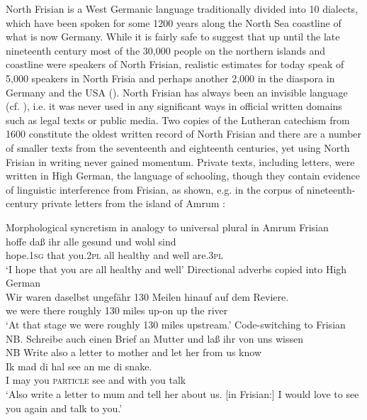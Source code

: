 \documentclass[output=paper]{langsci/langscibook}
\begin{document}
North Frisian is a West Germanic language traditionally divided into 10 dialects, which have been spoken for some 1200 years along the North Sea coastline of what is now Germany. While it is fairly safe to suggest that up until the late nineteenth century most of the 30,000 people on the northern islands and coastline were speakers of North Frisian, realistic estimates for today speak of 5,000 speakers in North Frisia and perhaps another 2,000 in the diaspora in Germany and the USA (\citealt{Arhammar2008}). North Frisian has always been an invisible language (cf. \citealt{HavingaLanger2016}), i.e. it was never used in any significant ways in official written domains such as legal texts or public media. Two copies of the Lutheran catechism from 1600 constitute the oldest written record of North Frisian and there are a number of smaller texts from the seventeenth and eighteenth centuries, yet using North Frisian in writing never gained momentum. Private texts, including letters, were written in High German, the language of schooling, though they contain evidence of linguistic interference from Frisian, as shown, e.g. in the corpus of nineteenth-century private letters from the island of Amrum \citet{Jacobs-Owen2017}: 

\ea
\label{ex:gregersen:1}
 Morphological syncretism in analogy to universal plural in Amrum Frisian \\
	\gll hoffe daß ihr alle gesund und wohl sind\\
     hope.\textsc{1sg} that you.\textsc{2pl} all healthy and well are.\textsc{3pl}\\
\glt ‘I hope that you are all healthy and well’ \citep[54]{Jacobs-Owen2017}
\ex
\label{ex:gregersen:2}
 {Directional adverbs copied into High German} \\
\gll Wir waren daselbst ungefähr 130 Meilen hinauf auf dem Reviere. \\
     we were there roughly 130 miles up-on up the river\\
\glt ‘At that stage we were roughly 130 miles upstream.’ \citep[71]{Jacobs-Owen2017}
\ex\label{ex:gregersen:3}
 {Code-switching to Frisian} \\
\gll NB. Schreibe auch einen Brief an Mutter und laß ihr von uns wissen\\ NB Write also a letter to mother and let her from us know \\

\gll Ik mad di hal see an me di snake. \\
     I may you \textsc{particle} see and with you talk\\
\glt ‘Also write a letter to mum and tell her about us. [in Frisian:] I would love to see you again and talk to you.’ {\citep[91]{Jacobs-Owen2017}}
\z
\end{document}
